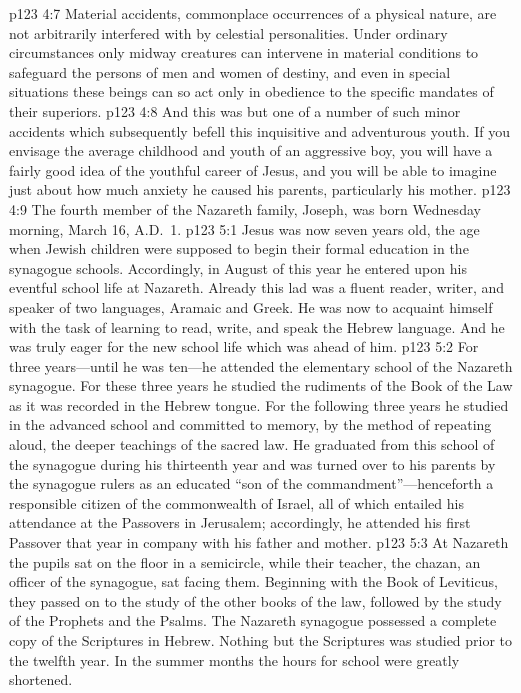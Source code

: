 \vs p123 4:7 Material accidents, commonplace occurrences of a physical nature, are not arbitrarily interfered with by celestial personalities. Under ordinary circumstances only midway creatures can intervene in material conditions to safeguard the persons of men and women of destiny, and even in special situations these beings can so act only in obedience to the specific mandates of their superiors.
\vs p123 4:8 And this was but one of a number of such minor accidents which subsequently befell this inquisitive and adventurous youth. If you envisage the average childhood and youth of an aggressive boy, you will have a fairly good idea of the youthful career of Jesus, and you will be able to imagine just about how much anxiety he caused his parents, particularly his mother.
\pc \vs p123 4:9 The fourth member of the Nazareth family, Joseph, was born Wednesday morning, March 16, A.D.~1.
\vs p123 5:1 Jesus was now seven years old, the age when Jewish children were supposed to begin their formal education in the synagogue schools. Accordingly, in August of this year he entered upon his eventful school life at Nazareth. Already this lad was a fluent reader, writer, and speaker of two languages, Aramaic and Greek. He was now to acquaint himself with the task of learning to read, write, and speak the Hebrew language. And he was truly eager for the new school life which was ahead of him.
\vs p123 5:2 For three years---until he was ten---he attended the elementary school of the Nazareth synagogue. For these three years he studied the rudiments of the Book of the Law as it was recorded in the Hebrew tongue. For the following three years he studied in the advanced school and committed to memory, by the method of repeating aloud, the deeper teachings of the sacred law. He graduated from this school of the synagogue during his thirteenth year and was turned over to his parents by the synagogue rulers as an educated “son of the commandment”---henceforth a responsible citizen of the commonwealth of Israel, all of which entailed his attendance at the Passovers in Jerusalem; accordingly, he attended his first Passover that year in company with his father and mother.
\pc \vs p123 5:3 At Nazareth the pupils sat on the floor in a semicircle, while their teacher, the chazan, an officer of the synagogue, sat facing them. Beginning with the Book of Leviticus, they passed on to the study of the other books of the law, followed by the study of the Prophets and the Psalms. The Nazareth synagogue possessed a complete copy of the Scriptures in Hebrew. Nothing but the Scriptures was studied prior to the twelfth year. In the summer months the hours for school were greatly shortened.
